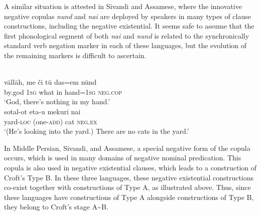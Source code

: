 \documentclass[output=paper,colorlinks,citecolor=brown]{langscibook}
\begin{document}
A similar situation is attested in Sivandi and Assamese, where the innovative negative copulas \textit{nund} and \textit{nai} are deployed by speakers in many types of clause constructions, including the negative existential. It seems safe to assume that the first phonological segment of both \textit{nai} and \textit{nund} is related to the synchronically standard verb negation marker in each of these languages, but the evolution of the remaining markers is difficult to ascertain. 
%
\begin{exe}\ex\label{ex:ieur-sivandi-nothing-in-hand}
\\
    \gll vāllāh, me    či      tū  das=em      nūnd \\
by.god  \textsc{1sg}  what  in  hand=\textsc{1sg}  \textsc{neg.cop} \\
    \glt `God, there's nothing in my hand.'
\ex\label{ex:ieur-assamese-nocats}
\\
    \gll sotal-ot    {\op}eta-u{\cp}      mekuri nai \\
yard-\textsc{loc} (one-\textsc{add}) cat \textsc{neg.ex} \\
    \glt `(He's looking into the yard.) There are no cats in the yard.'
    \end{exe}

In Middle Persian, Sivandi, and
Assamese, a special negative form of the copula occurs, which is used in many domains of negative nominal predication. This copula is also used in negative existential clauses, which leads to a construction of Croft's Type B. In these three languages, these negative existential constructions co-exist together with constructions of Type A, as illustrated above. Thus, since these languages have constructions of Type A alongside constructions of Type B, they belong to Croft's stage A{\textasciitilde}B. 
\end{document}
